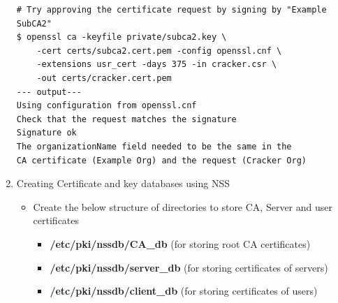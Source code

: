 \documentclass[12pt]{report}
\begin{document}
\begin{enumerate}[label*=\arabic*.]
\begin{lstlisting}[style=bashInputStyle]
# Try approving the certificate request by signing by "Example SubCA2"
$ openssl ca -keyfile private/subca2.key \
    -cert certs/subca2.cert.pem -config openssl.cnf \
    -extensions usr_cert -days 375 -in cracker.csr \
    -out certs/cracker.cert.pem
--- output---
Using configuration from openssl.cnf
Check that the request matches the signature
Signature ok
The organizationName field needed to be the same in the
CA certificate (Example Org) and the request (Cracker Org)
            \end{lstlisting}
    \item Creating Certificate and key databases using NSS 
        \begin{itemize}
            \item Create the below structure of directories to store CA, Server and user certificates
                \begin{itemize}
                    \item \textbf{/etc/pki/nssdb/CA\_db} (for storing root CA certificates)
                    \item \textbf{/etc/pki/nssdb/server\_db} (for storing certificates of servers)
                    \item \textbf{/etc/pki/nssdb/client\_db} (for storing certificates of users)
                \end{itemize}
            

\end{itemize}
\end{enumerate}
\end{document}
